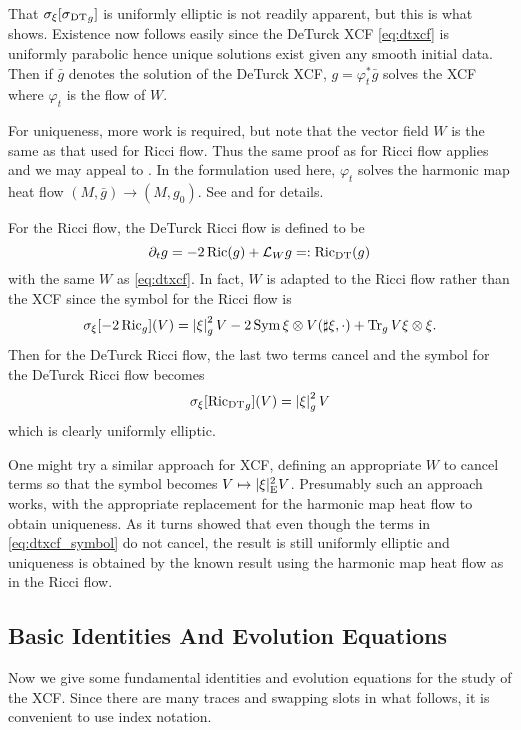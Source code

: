 \documentclass[a4paper,12pt]{amsart}
\begin{document}
That \(\sigma_{\xi}[\operatorname{\operatorname{\sigma}_{\operatorname{DT}}}_g]\) is uniformly elliptic is not readily apparent, but this is what \cite{MR2207496} shows. Existence now follows easily since the DeTurck XCF \eqref{eq:dtxcf} is uniformly parabolic hence unique solutions exist given any smooth initial data. Then if \(\bar{g}\) denotes the solution of the DeTurck XCF, \(g = \varphi_t^{\ast} \bar{g}\) solves the XCF where \(\varphi_t\) is the flow of \(W\).

For uniqueness, more work is required, but note that the vector field \(W\) is the same as that used for Ricci flow. Thus the same proof as for Ricci flow applies and we may appeal to \cite[Section 6]{MR1375255}. In the formulation used here, \(\varphi_t\) solves the harmonic map heat flow \((M, \bar{g}) \to (M, g_0)\). See \cite[Section 5.2]{MR2265040} and \cite[Sections 3.3, 3.4]{MR2061425} for details.

\begin{rem}
For the Ricci flow, the DeTurck Ricci flow is defined to be
\[
\partial_t g = -2\operatorname{Ric} (g) + \mathcal{L}_{W} g =: \operatorname{\operatorname{Ric}_{\operatorname{DT}}} (g)
\]
with the same \(W\) as \eqref{eq:dtxcf}. In fact, \(W\) is adapted to the Ricci flow rather than the XCF since the symbol for the Ricci flow is
\[
\sigma_{\xi} [-2\operatorname{Ric}_g] (V) = \left\lvert{\xi}\right\rvert^2_{g}V - 2 \operatorname{Sym} \xi \otimes V(\sharp \xi, \cdot) + \operatorname{Tr}_g V \xi \otimes \xi.
\]
Then for the DeTurck Ricci flow, the last two terms cancel and the symbol for the DeTurck Ricci flow becomes
\[
\sigma_{\xi} [\operatorname{\operatorname{Ric}_{\operatorname{DT}}}_g] (V) = \left\lvert{\xi}\right\rvert_g^2 V
\]
which is clearly uniformly elliptic.

One might try a similar approach for XCF, defining an appropriate \(W\) to cancel terms so that the symbol becomes \(V \mapsto |\xi|_{\operatorname{E}}^2 V\). Presumably such an approach works, with the appropriate replacement for the harmonic map heat flow to obtain uniqueness. As it turns \cite{MR2207496} showed that even though the terms in \eqref{eq:dtxcf_symbol} do not cancel, the result is still uniformly elliptic and uniqueness is obtained by the known result using the harmonic map heat flow as in the Ricci flow.
\end{rem}

\subsection{Basic Identities And Evolution Equations}
\label{subsec:xcf_identities}

Now we give some fundamental identities and evolution equations for the study of the XCF. Since there are many traces and swapping slots in what follows, it is convenient to use index notation.
\end{document}

